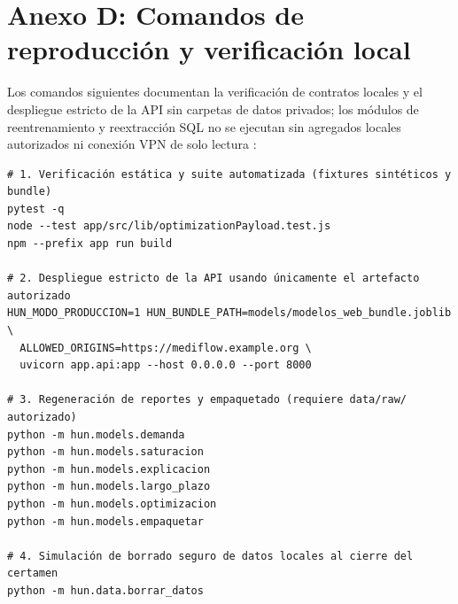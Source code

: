 \clearpage
\section{Anexo D: Comandos de reproducción y verificación local}

Los comandos siguientes documentan la verificación de contratos locales y el despliegue estricto de la API sin carpetas de datos privados; los módulos de reentrenamiento y reextracción SQL no se ejecutan sin agregados locales autorizados ni conexión VPN de solo lectura \parencite{mediflow2026informe,mediflow2026auditoria}:

{\singlespacing\footnotesize
\begin{verbatim}
# 1. Verificación estática y suite automatizada (fixtures sintéticos y bundle)
pytest -q
node --test app/src/lib/optimizationPayload.test.js
npm --prefix app run build

# 2. Despliegue estricto de la API usando únicamente el artefacto autorizado
HUN_MODO_PRODUCCION=1 HUN_BUNDLE_PATH=models/modelos_web_bundle.joblib \
  ALLOWED_ORIGINS=https://mediflow.example.org \
  uvicorn app.api:app --host 0.0.0.0 --port 8000

# 3. Regeneración de reportes y empaquetado (requiere data/raw/ autorizado)
python -m hun.models.demanda
python -m hun.models.saturacion
python -m hun.models.explicacion
python -m hun.models.largo_plazo
python -m hun.models.optimizacion
python -m hun.models.empaquetar

# 4. Simulación de borrado seguro de datos locales al cierre del certamen
python -m hun.data.borrar_datos
\end{verbatim}
}
